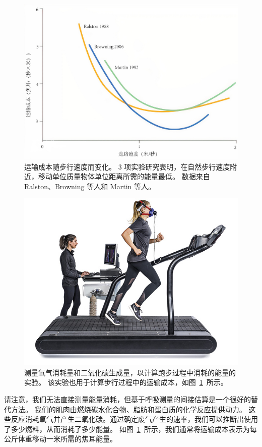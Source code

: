 \begin{figure}[!htb]
	\centering
	\includegraphics[width=0.75\linewidth]{chap2/2_11}
	\caption{运输成本随步行速度而变化。
		3 项实验研究表明，在自然步行速度附近，移动单位质量物体单位距离所需的能量最低。
		数据来自 Ralston\cite{ralston1958energy}、Browning 等人\cite{browning2006effects}和 Martin 等人\cite{martin1992effects}。 \label{fig:2_11}}
\end{figure}

\begin{figure}[!htb]
	\centering
	\includegraphics[width=1.0\linewidth]{chap2/2_12}
	\caption{测量氧气消耗量和二氧化碳生成量，以计算跑步过程中消耗的能量的实验。
		该实验也用于计算步行过程中的运输成本，如图~\ref{fig:2_11}~所示。 \label{fig:2_12}}
\end{figure}


请注意，我们无法直接测量能量消耗，但基于呼吸测量的间接估算是一个很好的替代方法。
我们的肌肉由燃烧碳水化合物、脂肪和蛋白质的化学反应提供动力。
这些反应消耗氧气并产生二氧化碳。通过确定废气产生的速率，我们可以推断出使用了多少燃料，从而消耗了多少能量。
如图~\ref{fig:2_11}~所示，我们通常将运输成本表示为每公斤体重移动一米所需的焦耳能量。



